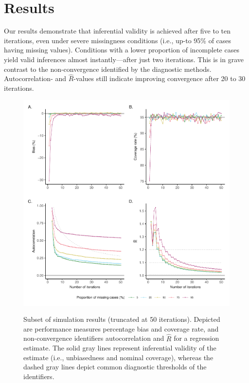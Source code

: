 \documentclass{article}
\begin{document}
\section{Results}
\label{results}

Our results demonstrate that inferential validity is achieved after five to ten iterations, even under severe missingness conditions (i.e., up-to 95\% of cases having missing values). Conditions with a lower proportion of incomplete cases yield valid inferences almost instantly---after just two iterations. This is in grave contrast to the non-convergence identified by the diagnostic methods. Autocorrelation- and $\widehat{R}$-values still indicate improving convergence after 20 to 30 iterations. 


\begin{figure}
{\centering \includegraphics{Figures/results} 
}
\caption{Subset of simulation results (truncated at 50 iterations). Depicted are performance measures percentage bias and coverage rate, and non-convergence identifiers autocorrelation and $\widehat{R}$ for a regression estimate. The solid gray lines represent inferential validity of the estimate (i.e., unbiasedness and nominal coverage), whereas the dashed gray lines depict common diagnostic thresholds of the identifiers.}\label{fig:res}
\end{figure}
\end{document}
